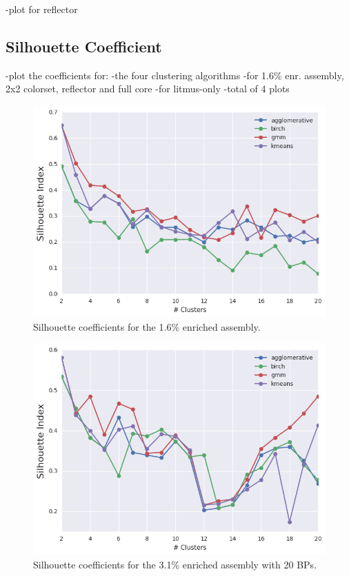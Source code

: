 \clearpage

-plot for reflector

\subsection{Silhouette Coefficient}
\label{subsec:chap11-silhouette-coeff}

-plot the coefficients for:
  -the four clustering algorithms
  -for 1.6\% enr. assembly, 2x2 colorset, reflector and full core
  -for litmus-only
  -total of 4 plots

\clearpage

\begin{figure}[h!]
\centering
\includegraphics[width=0.87\linewidth]{figures/results/model-select/assm-16/silhouette-combined-U238-capture-1}
\vspace{2mm}
\caption[Silhouette coefficients for the 1.6\% enriched assembly]{Silhouette coefficients for the 1.6\% enriched assembly.}
\label{fig:chap11-assm-16-silhouette-coeff}
\end{figure}

\begin{figure}[h!]
\centering
\includegraphics[width=0.87\linewidth]{figures/results/model-select/assm-31-20BPs/silhouette-combined-U238-capture-1}
\vspace{2mm}
\caption[Silhouette coefficients for the 3.1\% enriched assembly with 20 BPs]{Silhouette coefficients for the 3.1\% enriched assembly with 20 \acp{BP}.}
\label{fig:chap11-assm-31-20BPs-silhouette-coeff}
\end{figure}

